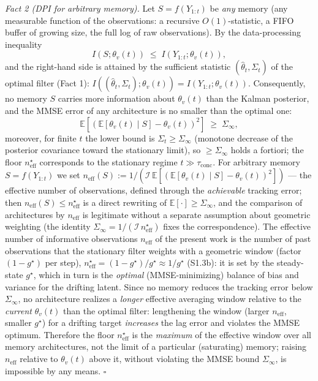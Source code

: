 \documentclass[12pt]{iopart}
\begin{document}
\emph{Fact 2 (DPI for arbitrary memory).} Let \(S = f(Y_{1:t})\) be \emph{any} memory (any measurable function of the observations: a recursive \(O(1)\)-statistic, a FIFO buffer of growing size, the full log of raw observations). By the data-processing inequality \[I(S;\theta_v(t)) \;\le\; I(Y_{1:t};\theta_v(t)),\] and the right-hand side is attained by the sufficient statistic \((\hat\theta_t,\Sigma_t)\) of the optimal filter (Fact 1): \(I((\hat\theta_t,\Sigma_t);\theta_v(t)) = I(Y_{1:t};\theta_v(t))\). Consequently, no memory \(S\) carries more information about \(\theta_v(t)\) than the Kalman posterior, and the MMSE error of any architecture is no smaller than the optimal one: \[\mathbb E[(\mathbb E[\theta_v(t)\mid S]-\theta_v(t))^2] \;\ge\; \Sigma_\infty,\] moreover, for finite \(t\) the lower bound is \(\Sigma_t\ge\Sigma_\infty\) (monotone decrease of the posterior covariance toward the stationary limit), so \(\ge\Sigma_\infty\) holds a fortiori; the floor \(n_{\text{eff}}^\star\) corresponds to the stationary regime \(t\gg\tau_{\text{conc}}\). For arbitrary memory \(S=f(Y_{1:t})\) we set \(n_{\text{eff}}(S):=1/(\mathcal I\,\mathbb E[(\mathbb E[\theta_v(t)\mid S]-\theta_v(t))^2])\) --- the effective number of observations, defined through the \emph{achievable} tracking error; then \(n_{\text{eff}}(S)\le n_{\text{eff}}^\star\) is a direct rewriting of \(\mathbb E[\cdot]\ge\Sigma_\infty\), and the comparison of architectures by \(n_{\text{eff}}\) is legitimate without a separate assumption about geometric weighting (the identity \(\Sigma_\infty=1/(\mathcal I\,n_{\text{eff}}^\star)\) fixes the correspondence). The effective number of informative observations \(n_{\text{eff}}\) of the present work is the number of past observations that the stationary filter weights with a geometric window (factor \((1-g^\star)\) per step), \(n_{\text{eff}}^\star = (1-g^\star)/g^\star \approx 1/g^\star\) (S1.3b): it is set by the steady-state \(g^\star\), which in turn is the \emph{optimal} (MMSE-minimizing) balance of bias and variance for the drifting latent. Since no memory reduces the tracking error below \(\Sigma_\infty\), no architecture realizes a \emph{longer} effective averaging window relative to the \emph{current} \(\theta_v(t)\) than the optimal filter: lengthening the window (larger \(n_{\text{eff}}\), smaller \(g^\star\)) for a drifting target \emph{increases} the lag error and violates the MMSE optimum. Therefore the floor \(n_{\text{eff}}^\star\) is the \emph{maximum} of the effective window over all memory architectures, not the limit of a particular (saturating) memory; raising \(n_{\text{eff}}\) relative to \(\theta_v(t)\) above it, without violating the MMSE bound \(\Sigma_\infty\), is impossible by any means. \(\square\)
\end{document}

